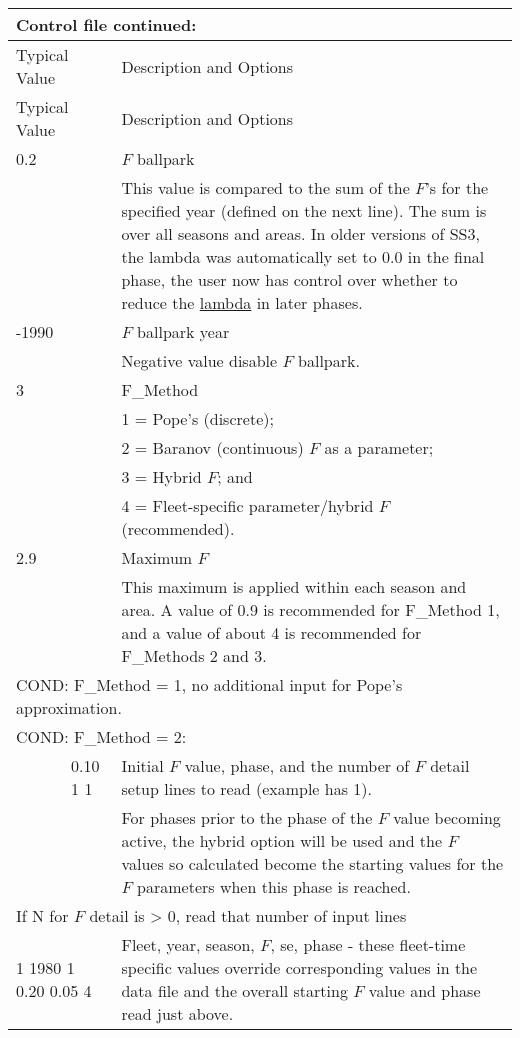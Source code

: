 \begin{longtable}{p{1cm} p{3cm} p{11cm}}
	\multicolumn{3}{l}{Control file continued:} \\
	\hline
	\multicolumn{2}{l}{Typical Value} & Description and Options \Tstrut\Bstrut\\
	\hline
	\endfirsthead

	\hline
	\multicolumn{2}{l}{Typical Value} & Description and Options \Tstrut\Bstrut\\
	\hline
	\endhead

	\hline
	\endfoot
	\endlastfoot

	0.2 \Tstrut & & $F$ ballpark \\
		& & This value is compared to the sum of the $F$'s for the specified year (defined on the next line). The sum is over all seasons and areas. In older versions of SS3, the lambda was automatically set to 0.0 in the final phase, the user now has control over whether to reduce the \hyperlink{Lambdas}{lambda} in later phases. \Bstrut\\
	\hline

	-1990\Tstrut & & $F$ ballpark year \\
		& & Negative value disable $F$ ballpark. \Bstrut\\
	\hline

	3 \Tstrut & & F\_Method \\
	   & & 1 = Pope's (discrete); \\
	   & & 2 = Baranov (continuous) $F$ as a parameter; \\
	   & & 3 = Hybrid $F$; and \\
	   & & 4 = Fleet-specific parameter/hybrid $F$ (recommended). \Bstrut\\
	\hline

	2.9 \Tstrut & & Maximum $F$ \\
	 & & This maximum is applied within each season and area. A value of 0.9 is recommended for F\_Method 1, and a value of about 4 is recommended for F\_Methods 2 and 3. \Bstrut\\
	\hline

	\multicolumn{3}{l}{COND: F\_Method = 1, no additional input for Pope's approximation.} \Tstrut\Bstrut\\
	\hline

	\multicolumn{3}{l}{COND: F\_Method = 2:} \Tstrut\\
	& 0.10 1 1 & Initial $F$ value, phase, and the number of $F$ detail setup lines to read (example has 1). \\
	&  & For phases prior to the phase of the $F$ value becoming active, the hybrid option will be used and the $F$ values so calculated become the starting values for the $F$ parameters when this phase is reached. \\
	\multicolumn{3}{l}{If N for $F$ detail is > 0, read that number of input lines} \Tstrut\\
	\multicolumn{2}{l}{1 1980 1 0.20 0.05 4} & Fleet, year, season, $F$, \gls{se}, phase - these fleet-time specific values override corresponding values in the data file and the overall starting $F$ value and phase read just above. \Bstrut\\
	\hline


\end{longtable}
